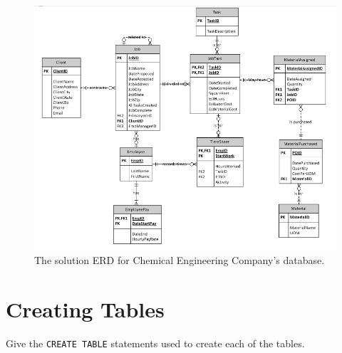\documentclass{article}
\begin{document}
\begin{figure}[h]
  \centering
  \includegraphics[width=.8\linewidth]{HW03_ERD}
  \caption{The solution ERD for Chemical Engineering Company's database.}
  \label{fig:ERD}
\end{figure}

\section{Creating Tables}
Give the \texttt{CREATE TABLE} statements used to create each of the tables.\\
\end{document}
